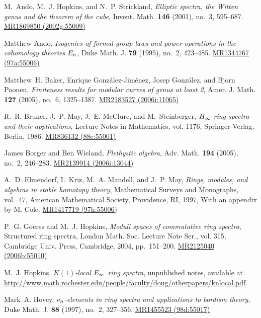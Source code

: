\documentclass{gtpart}
\theoremstyle{definition}
\theoremstyle{remark}
\begin{document}
\newcommand{\MRn}[2]{\href{http://www.ams.org/mathscinet-getitem?mr=#1}{MR#1 #2}}
\begin{thebibliography}

M.~Ando, M.~J. Hopkins, and N.~P. Strickland, \emph{Elliptic spectra, the
  {W}itten genus and the theorem of the cube}, Invent. Math. \textbf{146}
  (2001), no.~3, 595--687. \MRn{1869850}{(2002g:55009)}

Matthew Ando, \emph{Isogenies of formal group laws and power operations in the
  cohomology theories {$E\sb n$}}, Duke Math. J. \textbf{79} (1995), no.~2,
  423--485. \MRn{1344767}{(97a:55006)}

Matthew~H. Baker, Enrique Gonz{\'a}lez-Jim{\'e}nez, Josep Gonz{\'a}lez, and
  Bjorn Poonen, \emph{Finiteness results for modular curves of genus at least
  2}, Amer. J. Math. \textbf{127} (2005), no.~6, 1325--1387. \MRn{2183527}{(2006i:11065)}

R.~R. Bruner, J.~P. May, J.~E. McClure, and M.~Steinberger, \emph{{$H\sb \infty
  $} ring spectra and their applications}, Lecture Notes in Mathematics, vol.
  1176, Springer-Verlag, Berlin, 1986. \MRn{836132}{(88e:55001)}

James Borger and Ben Wieland, \emph{Plethystic algebra}, Adv. Math.
  \textbf{194} (2005), no.~2, 246--283. \MRn{2139914}{(2006i:13044)}

A.~D. Elmendorf, I.~Kriz, M.~A. Mandell, and J.~P. May, \emph{Rings, modules,
  and algebras in stable homotopy theory}, Mathematical Surveys and Monographs,
  vol.~47, American Mathematical Society, Providence, RI, 1997, With an
  appendix by M. Cole. \MRn{1417719}{(97h:55006)}

P.~G. Goerss and M.~J. Hopkins, \emph{Moduli spaces of commutative ring
  spectra}, Structured ring spectra, London Math. Soc. Lecture Note Ser., vol.
  315, Cambridge Univ. Press, Cambridge, 2004, pp.~151--200. \MRn{2125040}{(2006b:55010)}

M.~J. Hopkins, \emph{{$K(1)$}-local {$E\sb \infty $} ring spectra}, unpublished
  notes, available at 
  \href{http://www.math.rochester.edu/people/faculty/doug/otherpapers/knlocal.pdf}{http://\linebreak www.math.rochester.edu/people/faculty/doug/otherpapers/knlocal.pdf}.

Mark~A. Hovey, \emph{{$v\sb n$}-elements in ring spectra and applications to
  bordism theory}, Duke Math. J. \textbf{88} (1997), no.~2, 327--356.
  \MRn{1455523}{(98d:55017)}


\end{thebibliography}
\end{document}
